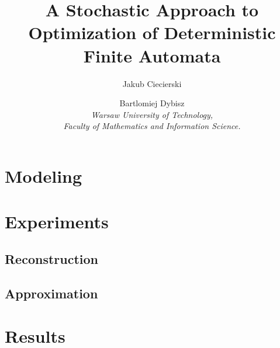 \documentclass[runningheads,a4paper]{llncs}
\begin{document}
\mainmatter  %

\title{A Stochastic Approach to Optimization of Deterministic Finite Automata}


\author{Jakub Ciecierski \and Bartlomiej Dybisz \\ 
\textit{Warsaw University of Technology,\\
Faculty of Mathematics and Information Science.}}
%

\maketitle

\section{Modeling}

\section{Experiments}

\subsection{Reconstruction}
\subsection{Approximation}

\section{Results}


%
\end{document}
